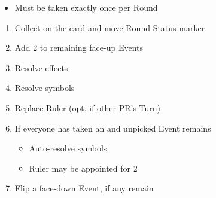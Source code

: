 \documentclass[10pt]{article}
\begin{document}
\addbackground
\addfooter


\begin{itemize}
	\item Must be taken exactly once per Round
\end{itemize}
\begin{enumerate}
	\item Collect \ducats on the card and move Round Status marker
	\item Add 2 \ducats to remaining face-up Events
	\item Resolve effects
	\item Resolve symbols
	\item Replace Ruler (opt. if other PR's Turn)
	\item If everyone has taken an  and unpicked Event remains
	\begin{itemize}
		\item Auto-resolve symbols
		\item Ruler may be appointed for 2\adminpower
	\end{itemize}
	\item Flip a face-down Event, if any remain
\end{enumerate}
\end{document}
